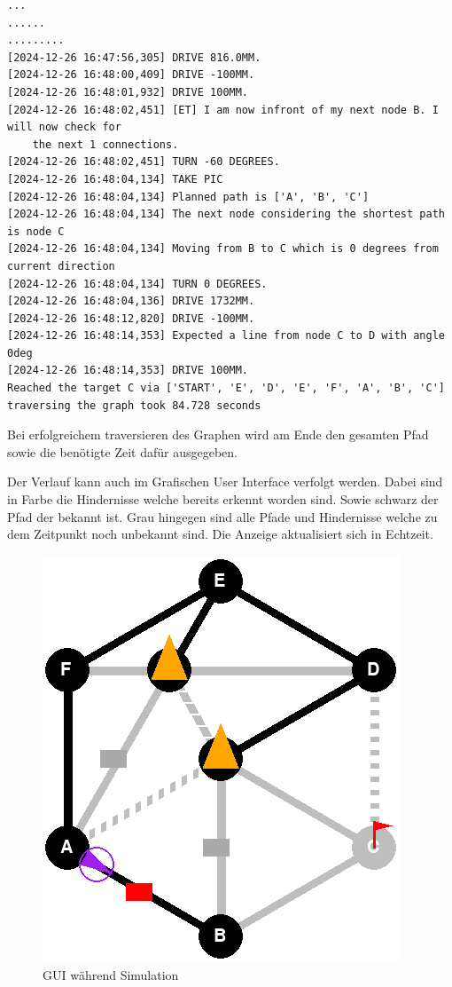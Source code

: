 \begin{footnotesize}
\begin{verbatim}
...
......
.........
[2024-12-26 16:47:56,305] DRIVE 816.0MM.
[2024-12-26 16:48:00,409] DRIVE -100MM.
[2024-12-26 16:48:01,932] DRIVE 100MM.
[2024-12-26 16:48:02,451] [ET] I am now infront of my next node B. I will now check for 
    the next 1 connections.
[2024-12-26 16:48:02,451] TURN -60 DEGREES.
[2024-12-26 16:48:04,134] TAKE PIC
[2024-12-26 16:48:04,134] Planned path is ['A', 'B', 'C']
[2024-12-26 16:48:04,134] The next node considering the shortest path is node C
[2024-12-26 16:48:04,134] Moving from B to C which is 0 degrees from current direction
[2024-12-26 16:48:04,134] TURN 0 DEGREES.
[2024-12-26 16:48:04,136] DRIVE 1732MM.
[2024-12-26 16:48:12,820] DRIVE -100MM.
[2024-12-26 16:48:14,353] Expected a line from node C to D with angle 0deg
[2024-12-26 16:48:14,353] DRIVE 100MM.
Reached the target C via ['START', 'E', 'D', 'E', 'F', 'A', 'B', 'C']
traversing the graph took 84.728 seconds
\end{verbatim}
\end{footnotesize}

Bei erfolgreichem traversieren des Graphen wird am Ende den gesamten Pfad sowie die benötigte Zeit dafür ausgegeben.

Der Verlauf kann auch im Grafischen User Interface verfolgt werden. Dabei sind in Farbe die Hindernisse welche bereits erkennt worden sind. Sowie schwarz der Pfad der bekannt ist. Grau hingegen sind alle Pfade und Hindernisse welche zu dem Zeitpunkt noch unbekannt sind.
Die Anzeige aktualisiert sich in Echtzeit.
\begin{figure}[H]
    \centering
    \includegraphics[width=0.5\linewidth]{assets//informatik-prototyp//simulator/simulator-run.png}
    \caption{GUI während Simulation}
    \label{fig:simulation-run}
\end{figure}

